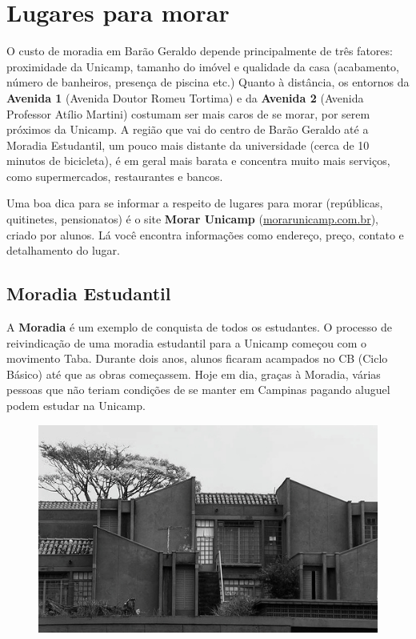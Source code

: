 
\section{Lugares para morar}

O custo de moradia em Barão Geraldo depende principalmente de três fatores:
proximidade da Unicamp, tamanho do imóvel e qualidade da casa (acabamento,
número de banheiros, presença de piscina etc.) Quanto à distância, os entornos da
\textbf{Avenida 1} (Avenida Doutor Romeu Tortima) e da \textbf{Avenida 2}
(Avenida Professor Atílio Martini) costumam ser mais caros de se morar, por serem
próximos da Unicamp. A região que vai do centro de Barão Geraldo até a Moradia
Estudantil, um pouco mais distante da universidade (cerca de 10 minutos de
bicicleta), é em geral mais barata e concentra muito mais serviços, como
supermercados, restaurantes e bancos.

Uma boa dica para se informar a respeito de lugares para morar (repúblicas,
quitinetes, pensionatos) é o site \textbf{Morar Unicamp}
(\url{morarunicamp.com.br}), criado por alunos. Lá você encontra informações
como endereço, preço, contato e detalhamento do lugar.

\subsection{Moradia Estudantil}

A \textbf{Moradia} é um exemplo de conquista de todos os estudantes. O processo
de reivindicação de uma moradia estudantil para a Unicamp começou com o
movimento Taba. Durante dois anos, alunos ficaram acampados no CB (Ciclo
Básico) até que as obras começassem. Hoje em dia, graças à Moradia, várias
pessoas que não teriam condições de se manter em Campinas pagando aluguel podem
estudar na Unicamp.

\begin{figure}[h!]
    \centering
    \includegraphics[scale=0.55,keepaspectratio=true]{img/imgs/5-moradia/-029.jpg}
\end{figure}

